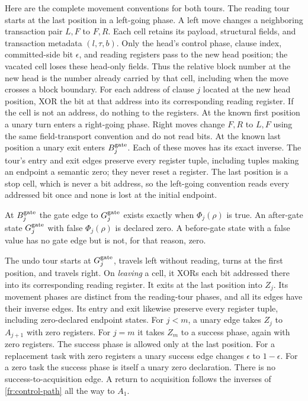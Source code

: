 Here are the complete movement conventions for both tours.  The
reading tour starts at the last position in a left-going phase.
A left move changes a neighboring transaction pair $L,F$ to $F,R$.
Each cell retains its payload, structural fields, and transaction
metadata $(l,\tau,b)$. Only the head's control phase, clause index,
committed-side bit $\epsilon$, and reading registers pass to the new
head position; the vacated cell loses these head-only fields.
Thus the relative block number at the new head is the number already
carried by that cell, including when the move crosses a block boundary.
For each address of clause $j$ located at the new head position, XOR
the bit at that address into its corresponding reading register.
If the cell is not an address, do nothing to the registers. At the
known first position a unary turn enters a right-going phase. Right
moves change $F,R$ to $L,F$ using the same field-transport convention
and do not read bits.  At the known last
position a unary exit enters $B_j^{\rm gate}$.  Each of these moves
has its exact inverse.  The tour's entry and exit edges preserve
every register tuple, including tuples making an endpoint a semantic
zero; they never reset a register.  The last position is a stop cell, which is
never a bit address, so the left-going convention reads every
addressed bit once and none is lost at the initial endpoint.

At $B_j^{\rm gate}$ the gate edge to $G_j^{\rm gate}$ exists exactly
when $\Phi_j(\rho)$ is true.  An after-gate state
$G_j^{\rm gate}$ with false $\Phi_j(\rho)$ is declared zero.  A
before-gate state with a false value has no gate edge but is not, for
that reason, zero.

The undo tour starts at $G_j^{\rm gate}$, travels left without
reading, turns at the first position, and travels right. On \emph{leaving}
a cell, it XORs each bit addressed there into its corresponding reading
register. It exits at the
last position into $Z_j$.  Its movement phases are distinct from the
reading-tour phases, and all its edges have their inverse edges.
Its entry and exit likewise preserve every register tuple, including
zero-declared endpoint states.
For $j<m$, a unary edge takes $Z_j$ to $A_{j+1}$ with zero registers.
For $j=m$ it takes $Z_m$ to a success phase, again with zero
registers.  The success phase is allowed only at the last position.
For a replacement task with zero registers a unary success edge changes $\epsilon$ to
$1-\epsilon$.  For a zero task the success phase is itself a unary
zero declaration.  There is no success-to-acquisition edge.  A
return to acquisition follows the inverses of
\eqref{fr:control-path} all the way to $A_1$.

